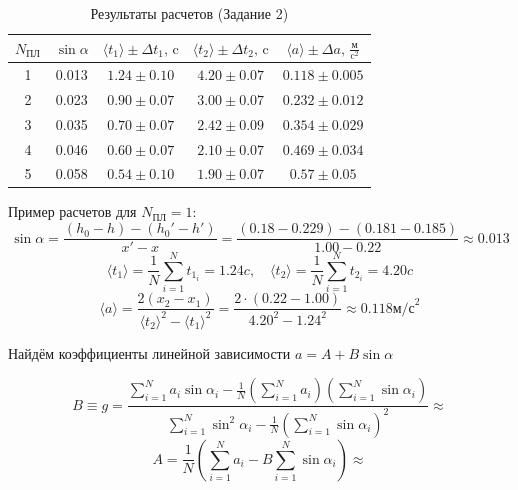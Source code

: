 \documentclass[14pt]{extreport}
\begin{document}
\begin{table}[H]
\centering
\caption{Результаты расчетов (Задание 2)}
\label{tab:table4}
\begin{tabular}{|c|c|c|c|c|}
\hline
$N_{\text{ПЛ}}$ & $\sin \alpha$ & $\langle t_1 \rangle \pm \Delta t_1, \, \text{c}$ & $\langle t_2 \rangle \pm \Delta t_2, \, \text{c}$ & $\langle a \rangle \pm \Delta a, \, \frac{\text{м}}{\text{c}^2}$ \\
\hline
1 & 0.013 & $1.24 \pm 0.10$ & $4.20 \pm 0.07$ & $0.118 \pm 0.005$ \\ \hline
2 & 0.023 & $0.90 \pm 0.07$ & $3.00 \pm 0.07$ & $0.232 \pm 0.012$ \\ \hline
3 & 0.035 & $0.70 \pm 0.07$ & $2.42 \pm 0.09$ & $0.354 \pm 0.029$ \\ \hline
4 & 0.046 & $0.60 \pm 0.07$ & $2.10 \pm 0.07$ & $0.469 \pm 0.034$ \\ \hline
5 & 0.058 & $0.54 \pm 0.10$ & $1.90 \pm 0.07$ & $0.57 \pm 0.05$ \\ \hline

\end{tabular}
\end{table}

Пример расчетов для $N_{\text{ПЛ}}=1$:
\begin{equation*}
    \sin{\alpha} = \frac{(h_0 - h) - (h_0' - h')}{x'-x}
    =\frac{(0.18 - 0.229) - (0.181 - 0.185)}{1.00-0.22} \approx 0.013
\end{equation*}
\begin{equation*}
\langle t_1 \rangle = \frac{1}{N}\sum\limits_{i=1}^{N} t_{1_i} = 1.24c, \quad
\langle t_2 \rangle = \frac{1}{N}\sum\limits_{i=1}^{N} t_{2_i} = 4.20c
\end{equation*}
\begin{equation*}
    \langle a \rangle = \frac{2(x_2 - x_1)}{{\langle t_2 \rangle}^2 - {\langle t_1 \rangle}^2} = \frac{2\cdot(0.22 - 1.00)}{4.20^2 - 1.24^2} \approx 0.118 \text{м/с}^2
\end{equation*}

Найдём коэффициенты линейной зависимости $a = A + B \sin{\alpha}$

\begin{equation*}
B \equiv g = \frac{
    \sum\limits_{i=1}^N a_i \sin\alpha_i - \frac{1}{N}\left(\sum\limits_{i=1}^N a_i\right)\left(\sum\limits_{i=1}^N \sin\alpha_i\right)
}{
    \sum\limits_{i=1}^N \sin^2\alpha_i - \frac{1}{N}\left(\sum\limits_{i=1}^N \sin\alpha_i\right)^2
} \approx 
\end{equation*}
\begin{equation*}
A = \frac{1}{N}\left(\sum_{i=1}^N a_i - B\sum_{i=1}^N \sin\alpha_i\right) \approx 
\end{equation*}
\end{document}
